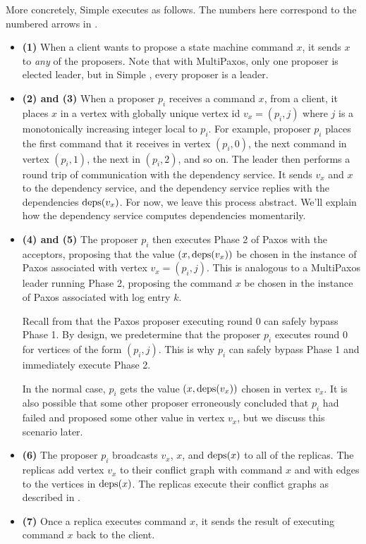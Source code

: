 More concretely, Simple \BPaxos{} executes as follows. The numbers here
correspond to the numbered arrows in .
\begin{itemize}
  \item \textbf{(1)}
    When a client wants to propose a state machine command $x$, it sends $x$ to
    \emph{any} of the proposers. Note that with MultiPaxos, only one proposer
    is elected leader, but in Simple \BPaxos{}, every proposer is a leader.

  \item \textbf{(2) and (3)}
    When a proposer $p_i$ receives a command $x$, from a client, it places $x$
    in a vertex with globally unique vertex id $v_x = (p_i, j)$ where $j$ is a
    monotonically increasing integer local to $p_i$. For example, proposer
    $p_i$ places the first command that it receives in vertex $(p_i, 0)$, the
    next command in vertex $(p_i, 1)$, the next in $(p_i, 2)$, and so on. The
    leader then performs a round trip of communication with the dependency
    service. It sends $v_x$ and $x$ to the dependency service, and the
    dependency service replies with the dependencies $\text{deps}(v_x)$. For now, we
    leave this process abstract. We'll explain how the dependency service
    computes dependencies momentarily.

  \item \textbf{(4) and (5)}
    The proposer $p_i$ then executes Phase 2 of Paxos with the acceptors,
    proposing that the value $(x, \text{deps}(v_x))$ be chosen in the instance of
    Paxos associated with vertex $v_x = (p_i, j)$. This is analogous to a
    MultiPaxos leader running Phase 2, proposing the command $x$ be chosen in
    the instance of Paxos associated with log entry $k$.

    Recall from  that the Paxos proposer executing round 0
    can safely bypass Phase 1. By design, we predetermine that the proposer
    $p_i$ executes round $0$ for vertices of the form $(p_i, j)$. This is why
    $p_i$ can safely bypass Phase 1 and immediately execute Phase 2.

    In the normal case, $p_i$ gets the value $(x, \text{deps}(v_x))$ chosen in vertex
    $v_x$. It is also possible that some other proposer erroneously concluded
    that $p_i$ had failed and proposed some other value in vertex $v_x$, but we
    discuss this scenario later.

  \item \textbf{(6)}
    The proposer $p_i$ broadcasts $v_x$, $x$, and $\text{deps}(x)$ to all of the
    replicas. The replicas add vertex $v_x$ to their conflict graph with
    command $x$ and with edges to the vertices in $\text{deps}(x)$. The replicas
    execute their conflict graphs as described in .

  \item \textbf{(7)}
    Once a replica executes command $x$, it sends the result of executing
    command $x$ back to the client.
\end{itemize}

